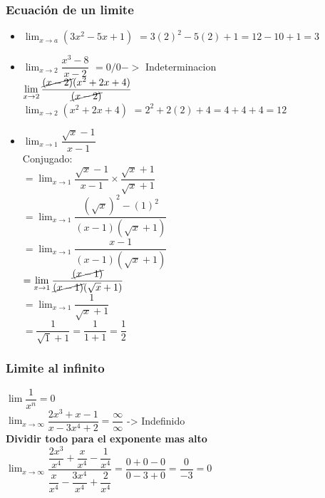 \documentclass[stu, 12pt, letterpaper, donotrepeattitle, floatsintext, natbib]{apa7}
\begin{document}
    \subsubsection{Ecuación de un limite}
    \begin{itemize}
        \item $\displaystyle\lim_{x \to a} (3x^2 -5x +1)$
        \hspace{2cm} $= 3(2)^2-5(2)+1 = 12-10+1 = 3$ \\[0.5cm]

        \item $\displaystyle\lim_{x \to 2} \dfrac{x^3-8}{x-2}$ \hspace{3cm} $=0/0 ->$ Indeterminacion \\[0.5cm]
        $\displaystyle\lim_{x \to 2}\dfrac{\cancel{(x-2)}(x^2+2x+4)}{\cancel{(x-2)}}$\\[0.5cm]
        $\displaystyle\lim_{x \to 2}(x^2+2x+4)$\hspace{1cm} $= 2^2+2(2)+4 = 4+4+4 = 12$\\[0.5cm]

        \item $\displaystyle\lim_{x\to 1} \dfrac{\sqrt {x}-1}{x-1}$\\[0.5cm]
        Conjugado: \\[0.5cm]
        $ = \displaystyle\lim_{x\to1} \dfrac{\sqrt {x}-1}{x-1} \times \dfrac{\sqrt {x}+1}{\sqrt {x}+1}$\\[0.5cm]
        $ = \displaystyle\lim_{x\to1} \dfrac{(\sqrt {x})^2 - (1)^2}{(x-1)(\sqrt {x}+1)}$\\[0.5cm]
        $ = \displaystyle\lim_{x\to1} \dfrac{x-1}{(x-1)(\sqrt {x}+1)}$\\[0.5cm]
        $ = \displaystyle\lim_{x\to1} \dfrac{\cancel{(x-1)}}{\cancel{(x-1)}(\sqrt {x}+1)}$\\[0.5cm]
        $ = \displaystyle\lim_{x\to1} \dfrac{1}{\sqrt {x}+1}$\\[0.5cm]
        $ = \dfrac{1}{\sqrt {1}+1} = \dfrac{1}{1+1} = \dfrac{1}{2}$\\[0.5cm]
    \end{itemize}

    \subsubsection{Limite al infinito}
    $\displaystyle\lim \dfrac{1}{x^n} = 0$ \\[0.5cm]
    $\displaystyle\lim_{x \to \infty} \dfrac{2x^3+x-1}{x-3x^4+2} = \dfrac{\infty}{\infty} $\hspace{2cm} -> Indefinido\\[0.5cm]
    \textbf{Dividir todo para el exponente mas alto}\\[0.5cm]
    $\displaystyle\lim_{x \to \infty} \dfrac{\dfrac{2x^3}{x^4}+\dfrac{x}{x^4}-\dfrac{1}{x^4}}{\dfrac{x}{x^4}-\dfrac{3x^4}{x^4}+\dfrac{2}{x^4}} = \dfrac{0+0-0}{0-3+0} = \dfrac{0}{-3} = 0$\\[0.5cm]
\end{document}
